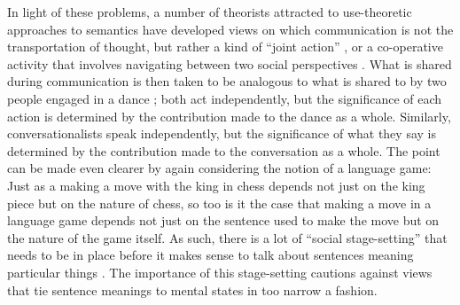 In light of these problems, a number of theorists attracted to use-theoretic approaches to semantics have developed views on which communication is not the transportation of thought, but rather a kind of ``joint action'' \citep{Clark:1996}, or a co-operative activity that involves navigating between two social perspectives \citep{Brandom:1994}. What is shared during communication is then taken to be analogous to what is shared to by two people engaged in a dance \citep{Clark:1996,Brandom:2010}; both act independently, but the significance of each action is determined by the contribution made to the dance as a whole. Similarly, conversationalists speak independently, but the significance of what they say is determined by the contribution made to the conversation as a whole. The point can be made even clearer by again considering the notion of a language game: Just as a making a move with the king in chess depends not just on the king piece but on the nature of chess, so too is it the case that making a move in a language game depends not just on the sentence used to make the move but on the nature of the game itself. As such, there is a lot of ``social stage-setting'' that needs to be in place before it makes sense to talk about sentences meaning particular things \citep[][p. 461]{Brandom:1994}. The importance of this stage-setting cautions against views that tie sentence meanings to mental states in too narrow a fashion. 

